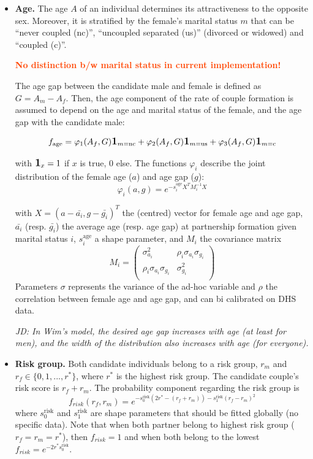 \documentclass[11pt, onecolumn]{article}
\newcommand{\one}[1]{\textbf{\large{1}}_{#1}}
\newcommand{\warning}[1]{\textbf{\textcolor{OrangeRed}{#1}}}
\begin{document}
\begin{itemize}

\item \textbf{Age.} The age $A$ of an individual determines its attractiveness to the opposite sex. Moreover, it is stratified by the female's marital status $m$ that can be ``never coupled (nc)'', ``uncoupled separated (us)'' (divorced or widowed) and ``coupled (c)''. 

\warning{No distinction b/w marital status in current implementation!}

The age gap between the candidate male and female is defined as $G=A_m-A_f$. Then, the age component of the rate of couple formation is assumed to depend on the age and marital status of the female, and the age gap with the candidate male:

$$f_{\mathrm{age}}= \varphi_1(A_f,G)  \one{m=\mathrm{nc}}
+\varphi_2(A_f,G)\one{m=\mathrm{us}}+\varphi_3(A_f,G)\one{m=\mathrm{c}} $$
 
with $\one{x}=1$ if $x$ is true, 0 else. The functions $\varphi_i$ describe the joint distribution of the female age ($a$)  and age gap ($g$):
$$\varphi_i(a,g)=e^{-s^{\mathrm{age}}_i X^T M_i^{-1} X}$$

with $X=(a-\bar{a_i},g-\bar{g_i})^T$ the (centred) vector for female age and age gap, $\bar{a_i}$ (resp. $\bar{g_i}$) the average age (resp. age gap) at partnership formation given marital status $i$, $s^{\mathrm{age}}_i$ a shape parameter, and $M_i$ the covariance matrix
$$M_i=\begin{pmatrix}
\sigma^2_{a_i} & \rho_i\sigma_{a_i}\sigma_{g_i} \\
\rho_i\sigma_{a_i}\sigma_{g_i} & \sigma^2_{g_i} \\
\end{pmatrix}$$
Parameters $\sigma$ represents the variance of the ad-hoc variable and $\rho$ the correlation between female age and age gap, and can bi calibrated on DHS data.

\emph{JD:  In Wim's model, the desired age gap increases with age (at least for men), and the \emph{width} of the distribution also increases with age (for everyone).}

\item \textbf{Risk group.} Both candidate individuals belong to a risk group, $r_m$ and $r_f\in \{0,1,...,r^*\}$, where $r^*$ is the highest risk group. The candidate couple's risk score is $r_f+r_m$. The probability component regarding the risk group is
$$f_{risk}(r_f,r_m) = e^{-s^{\mathrm{risk}}_0(2r^*-(r_f+r_m))-s^{\mathrm{risk}}_1(r_f-r_m)^2}$$
where $s^{\mathrm{risk}}_0$ and $s^{\mathrm{risk}}_1$ are shape parameters that should be fitted globally (no specific data). Note that when both partner belong to highest risk group ($r_f=r_m=r^*$), then $f_{risk}=1$ and when both belong to the lowest $f_{risk}=e^{-2r^*s^{\mathrm{risk}}_0}$.


\end{itemize}
\end{document}
